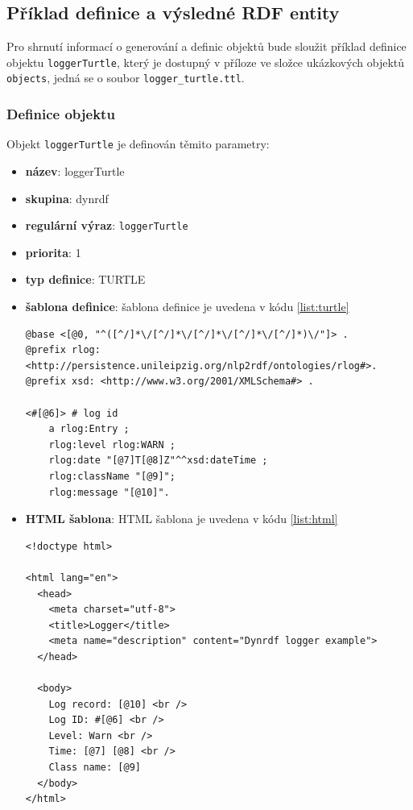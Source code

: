 \documentclass[thesis=B,czech]{FITthesis}[2012/06/26]
\begin{document}
    \subsection{Příklad definice a výsledné RDF entity}
    Pro shrnutí informací o generování a definic objektů bude sloužit příklad definice objektu \texttt{loggerTurtle}, který je dostupný v příloze
    ve složce ukázkových objektů \texttt{objects}, jedná se o soubor \texttt{logger\_turtle.ttl}.
    
    \subsubsection{Definice objektu} \label{example_def}
    Objekt \texttt{loggerTurtle} je definován těmito parametry:
    \begin{itemize}
     \item \textbf{název}: loggerTurtle
     \item \textbf{skupina}: dynrdf
     \item \textbf{regulární výraz}: \texttt{loggerTurtle}
     \item \textbf{priorita}: 1
     \item \textbf{typ definice}: TURTLE
     \item \textbf{šablona definice}: šablona definice je uvedena v kódu \ref{list:turtle}
          \begin{lstlisting}[float=htb,caption={Šablona RDF entity v Turtle formátu pro objekt loggerTurtle},label={list:turtle}]
@base <[@0, "^([^/]*\/[^/]*\/[^/]*\/[^/]*\/[^/]*)\/"]> .
@prefix rlog: 
<http://persistence.unileipzig.org/nlp2rdf/ontologies/rlog#>.
@prefix xsd: <http://www.w3.org/2001/XMLSchema#> .

<#[@6]> # log id 
	a rlog:Entry ;
  	rlog:level rlog:WARN ;
	rlog:date "[@7]T[@8]Z"^^xsd:dateTime ;
	rlog:className "[@9]";
	rlog:message "[@10]".
\end{lstlisting}
     \item \textbf{HTML šablona}: HTML šablona je uvedena v kódu \ref{list:html}
               \begin{lstlisting}[float=htb,caption={HTML šablona pro objekt loggerTurtle},label={list:html}]
<!doctype html>

<html lang="en">
  <head>
    <meta charset="utf-8">
    <title>Logger</title>
    <meta name="description" content="Dynrdf logger example">
  </head>

  <body>
    Log record: [@10] <br />
    Log ID: #[@6] <br />
    Level: Warn <br />
    Time: [@7] [@8] <br />
    Class name: [@9]
  </body>
</html>
\end{lstlisting}
    \end{itemize}
    
\end{document}
